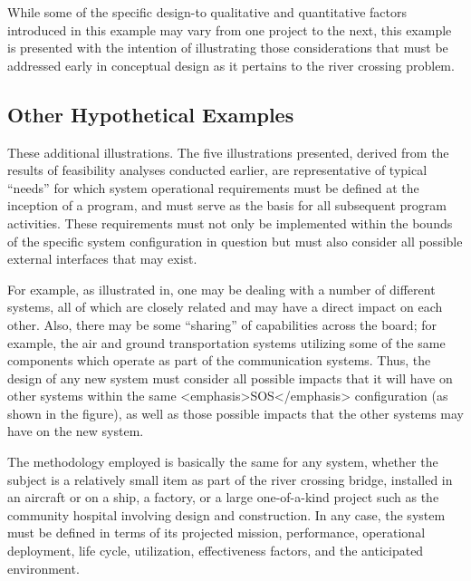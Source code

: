 While some of the specific design-to qualitative and quantitative factors introduced in this example may vary from one project to the next, this example is presented with the intention of illustrating those considerations that must be addressed early in conceptual design as it pertains to the river crossing problem.
    
\subsection{Other Hypothetical Examples}


These additional illustrations. The five illustrations presented, derived from the results of feasibility analyses conducted earlier, are representative of typical ``needs'' for which system operational requirements must be defined at the inception of a program, and must serve as the basis for all subsequent program activities. These requirements must not only be implemented within the bounds of the specific system configuration in question but must also consider all possible external interfaces that may exist.

For example, as illustrated in, one may be dealing with a number of different systems, all of which are closely related and may have a direct impact on each other. Also, there may be some ``sharing'' of capabilities across the board; for example, the air and ground transportation systems utilizing some of the same components which operate as part of the communication systems. Thus, the design of any new system must consider all possible impacts that it will have on other systems within the same <emphasis>SOS</emphasis> configuration (as shown in the figure), as well as those possible impacts that the other systems may have on the new system.

The methodology employed is basically the same for any system, whether the subject is a relatively small item as part of the river crossing bridge, installed in an aircraft or on a ship, a factory, or a large one-of-a-kind project such as the community hospital involving design and construction. In any case, the system must be defined in terms of its projected mission, performance, operational deployment, life cycle, utilization, effectiveness factors, and the anticipated environment.